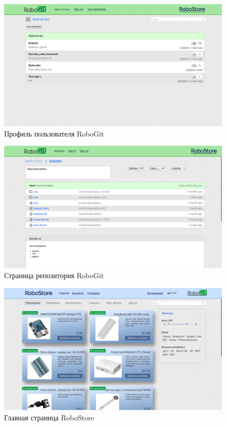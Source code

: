 \documentclass[12pt, a4paper]{article}
\begin{document}
\begin{figure}[H]
  \centering
  \includegraphics[width=16cm]{png/git_profile.png}
  \caption{Профиль пользователя RoboGit}
\end{figure}

\begin{figure}[H]
  \centering
  \includegraphics[width=16cm]{png/git_repo.png}
  \caption{Страница репозитория RoboGit}
\end{figure}

\begin{figure}[H]
  \centering
  \includegraphics[width=16cm]{png/store_main.png}
  \caption{Главная страница RoboStore}
\end{figure}
\end{document}
